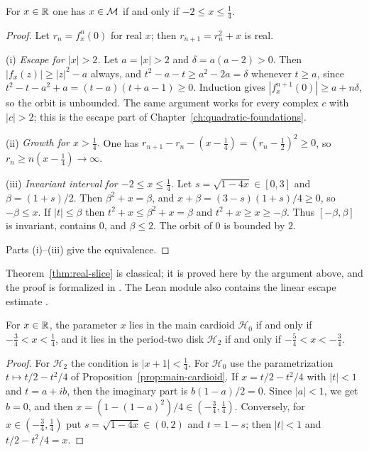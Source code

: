 \begin{theorem}
\label{thm:real-slice}
For $x\in\mathbb R$ one has $x\in\mathcal M$ if and only if $-2\le x\le\tfrac14$.
\end{theorem}

\begin{proof}
Let $r_n=f_x^n(0)$ for real $x$; then $r_{n+1}=r_n^2+x$ is real.

(i) \emph{Escape for $|x|>2$.}  Let $a=|x|>2$ and $\delta=a(a-2)>0$.  Then
$|f_x(z)|\ge|z|^2-a$ always, and $t^2-a-t\ge a^2-2a=\delta$ whenever $t\ge a$,
since $t^2-t-a^2+a=(t-a)(t+a-1)\ge0$.  Induction gives
$|f_x^{n+1}(0)|\ge a+n\delta$, so the orbit is unbounded.  The same argument
works for every complex $c$ with $|c|>2$; this is the escape part of
Chapter~\ref{ch:quadratic-foundations}.

(ii) \emph{Growth for $x>\tfrac14$.}  One has $r_{n+1}-r_n-(x-\tfrac14)=(r_n-\tfrac12)^2\ge0$,
so $r_n\ge n(x-\tfrac14)\to\infty$.

(iii) \emph{Invariant interval for $-2\le x\le\tfrac14$.}  Let $s=\sqrt{1-4x}\in[0,3]$
and $\beta=(1+s)/2$.  Then $\beta^2+x=\beta$, and $x+\beta=(3-s)(1+s)/4\ge0$, so
$-\beta\le x$.  If $|t|\le\beta$ then $t^2+x\le\beta^2+x=\beta$ and
$t^2+x\ge x\ge-\beta$.  Thus $[-\beta,\beta]$ is invariant, contains $0$, and
$\beta\le2$.  The orbit of $0$ is bounded by $2$.

Parts (i)--(iii) give the equivalence.
\end{proof}

\begin{remark}
Theorem~\ref{thm:real-slice} is classical; it is proved here by the argument
above, and the proof is formalized in
.
The Lean module also contains the linear escape estimate
.
\end{remark}

\begin{corollary}
\label{cor:real-components}
For $x\in\mathbb R$, the parameter $x$ lies in the main cardioid $\mathcal H_0$ if and only if $-\tfrac34<x<\tfrac14$, and it
lies in the period-two disk $\mathcal H_2$ if and only if $-\tfrac54<x<-\tfrac34$.
\end{corollary}

\begin{proof}
For $\mathcal H_2$ the condition is $|x+1|<\tfrac14$.  For $\mathcal H_0$ use the parametrization
$t\mapsto t/2-t^2/4$ of Proposition~\ref{prop:main-cardioid}.  If $x=t/2-t^2/4$ with $|t|<1$ and $t=a+ib$, then the imaginary part is
$b(1-a)/2=0$.  Since $|a|<1$, we get $b=0$, and then $x=(1-(1-a)^2)/4\in(-\tfrac34,\tfrac14)$.  Conversely, for
$x\in(-\tfrac34,\tfrac14)$ put $s=\sqrt{1-4x}\in(0,2)$ and $t=1-s$; then $|t|<1$ and $t/2-t^2/4=x$.
\end{proof}


